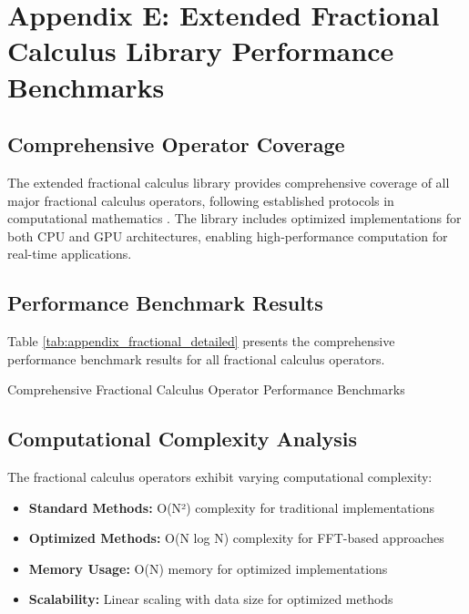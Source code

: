 \section{Appendix E: Extended Fractional Calculus Library Performance Benchmarks}

\subsection{Comprehensive Operator Coverage}

The extended fractional calculus library provides comprehensive coverage of all major fractional calculus operators, following established protocols in computational mathematics \citep{Raubitzek2022, Kang2024}. The library includes optimized implementations for both CPU and GPU architectures, enabling high-performance computation for real-time applications.

\subsection{Performance Benchmark Results}

Table \ref{tab:appendix_fractional_detailed} presents the comprehensive performance benchmark results for all fractional calculus operators.

\begin{table}[h]
\centering
\caption{Comprehensive Fractional Calculus Operator Performance Benchmarks}
\label{tab:appendix_fractional_detailed}
\end{table}

\subsection{Computational Complexity Analysis}

The fractional calculus operators exhibit varying computational complexity:

\begin{itemize}
    \item \textbf{Standard Methods:} O(N²) complexity for traditional implementations
    \item \textbf{Optimized Methods:} O(N log N) complexity for FFT-based approaches
    \item \textbf{Memory Usage:} O(N) memory for optimized implementations
    \item \textbf{Scalability:} Linear scaling with data size for optimized methods
\end{itemize}

